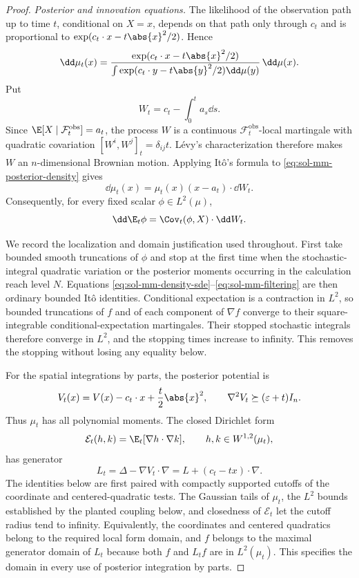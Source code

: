 \documentclass[../main.tex]{subfiles}
\begin{document}
\begin{proof}
\noindent\emph{Posterior and innovation equations.}
The likelihood of the observation path up to time $t$, conditional on $X=x$, depends on that
path only through $c_t$ and is proportional to
$\exp(c_t\cdot x-t\abs{x}^2/2)$.  Hence
\begin{equation}
  \dd\mu_t(x)
  =\frac{\exp(c_t\cdot x-t\abs{x}^2/2)}
  {\int\exp(c_t\cdot y-t\abs{y}^2/2)\dd\mu(y)}\,\dd\mu(x).
  \label{eq:sol-mm-posterior-density}
\end{equation}
Put
\[
  W_t=c_t-\int_0^ta_s\dd s.
\]
Since $\E[X\mid\mathcal F_t^{\mathrm{obs}}]=a_t$, the process $W$ is a continuous
$\mathcal F_t^{\mathrm{obs}}$-local martingale with quadratic covariation
$[W^i,W^j]_t=\delta_{ij}t$.  L\'evy's characterization therefore makes $W$ an
$n$-dimensional Brownian motion.  Applying It\^o's formula to
\eqref{eq:sol-mm-posterior-density} gives
\begin{equation}
  \dd\mu_t(x)=\mu_t(x)(x-a_t)\cdot\dd W_t.
  \label{eq:sol-mm-density-sde}
\end{equation}
Consequently, for every fixed scalar $\phi\in L^2(\mu)$,
\begin{equation}
  \dd\E_t\phi=\Cov_t(\phi,X)\cdot\dd W_t.
  \label{eq:sol-mm-filtering}
\end{equation}

We record the localization and domain justification used throughout.  First take bounded smooth
truncations of $\phi$ and stop at the first time when the stochastic-integral quadratic
variation or the posterior moments occurring in the calculation reach level $N$.  Equations
\eqref{eq:sol-mm-density-sde}--\eqref{eq:sol-mm-filtering} are then ordinary bounded It\^o
identities.  Conditional expectation is a contraction in $L^2$, so bounded truncations of $f$
and of each component of $\nabla f$ converge to their square-integrable conditional-expectation
martingales.  Their stopped stochastic integrals therefore converge in $L^2$, and the stopping
times increase to infinity.  This removes the stopping without losing any equality below.

For the spatial integrations by parts, the posterior potential is
\[
  V_t(x)=V(x)-c_t\cdot x+\frac t2\abs{x}^2,
  \qquad \nabla^2V_t\succeq(\varepsilon+t)I_n.
\]
Thus $\mu_t$ has all polynomial moments.  The closed Dirichlet form
\[
  \mathcal E_t(h,k)=\E_t[\nabla h\cdot\nabla k],
  \qquad h,k\in W^{1,2}(\mu_t),
\]
has generator
\begin{equation}
  L_t=\Delta-\nabla V_t\cdot\nabla
      =L+(c_t-tx)\cdot\nabla.
  \label{eq:sol-mm-Lt}
\end{equation}
The identities below are first paired with compactly supported cutoffs of the coordinate and
centered-quadratic tests.  The Gaussian tails of $\mu_t$, the $L^2$ bounds established by the
planted coupling below, and closedness of $\mathcal E_t$ let the cutoff radius tend to infinity.
Equivalently, the coordinates and centered quadratics belong to the required local form domain,
and $f$ belongs to the maximal generator domain of $L_t$ because both $f$ and $L_tf$ are in
$L^2(\mu_t)$.  This specifies the domain in every use of posterior integration by parts.


\end{proof}
\end{document}
